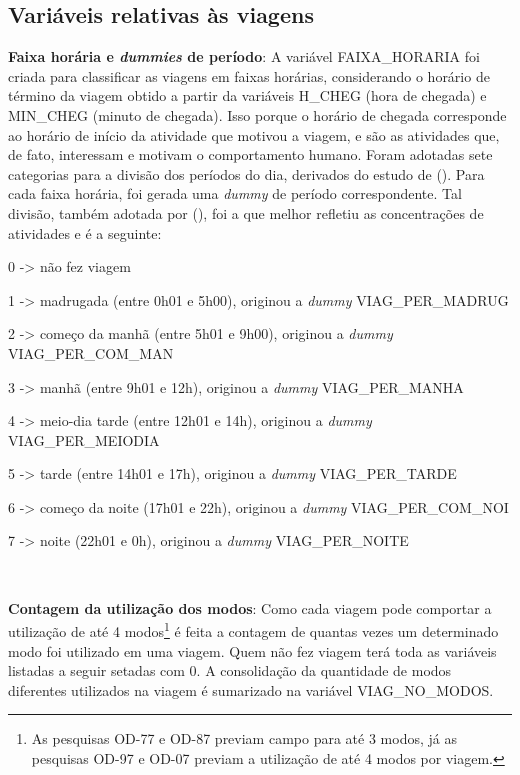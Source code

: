 \subsection{Variáveis relativas às viagens}\label{subsec:novas-var-viag}

\begin{compactitem}

\item \textbf{Faixa horária e \textit{dummies} de período}: A variável FAIXA_HORARIA foi criada para classificar as viagens em faixas horárias, considerando o horário de término da viagem obtido a partir da variáveis H_CHEG (hora de chegada) e MIN_CHEG (minuto de chegada). Isso porque o horário de chegada corresponde ao horário de início da atividade que motivou a viagem, e são as atividades que, de fato, interessam e motivam o comportamento humano. 
Foram adotadas sete categorias para a divisão dos períodos do dia, derivados do estudo de  (\citeyear{VESPUCCI2003}). Para cada faixa horária, foi gerada uma \textit{dummy} de período correspondente. Tal divisão, também adotada por  (\citeyear{GERMANI2005}), foi a que melhor refletiu as concentrações de atividades e é a seguinte:
    \begin{compactitem}[]
    \item 0 -> não fez viagem 
    \item 1 -> madrugada (entre 0h01 e 5h00), originou a \textit{dummy} VIAG_PER_MADRUG
    \item 2 -> começo da manhã (entre 5h01 e 9h00), originou a \textit{dummy} VIAG_PER_COM_MAN
    \item 3 -> manhã (entre 9h01 e 12h), originou a \textit{dummy} VIAG_PER_MANHA
    \item 4 -> meio-dia tarde (entre 12h01 e 14h), originou a \textit{dummy} VIAG_PER_MEIODIA
    \item 5 -> tarde (entre 14h01 e 17h), originou a \textit{dummy} VIAG_PER_TARDE
    \item 6 -> começo da noite (17h01 e 22h), originou a \textit{dummy} VIAG_PER_COM_NOI
    \item 7 -> noite (22h01 e 0h), originou a \textit{dummy} VIAG_PER_NOITE
    \end{compactitem}\

\item \textbf{Contagem da utilização dos modos}: Como cada viagem pode comportar a utilização de até 4 modos\footnote{As pesquisas OD-77 e OD-87 previam campo para até 3 modos, já as pesquisas OD-97 e OD-07 previam a utilização de até 4 modos por viagem.} é feita a contagem de quantas vezes um determinado modo foi utilizado em uma viagem. Quem não fez viagem terá toda as variáveis listadas a seguir setadas com 0. A consolidação da quantidade de modos diferentes utilizados na viagem é sumarizado na variável VIAG_NO_MODOS. 


\end{compactitem}
